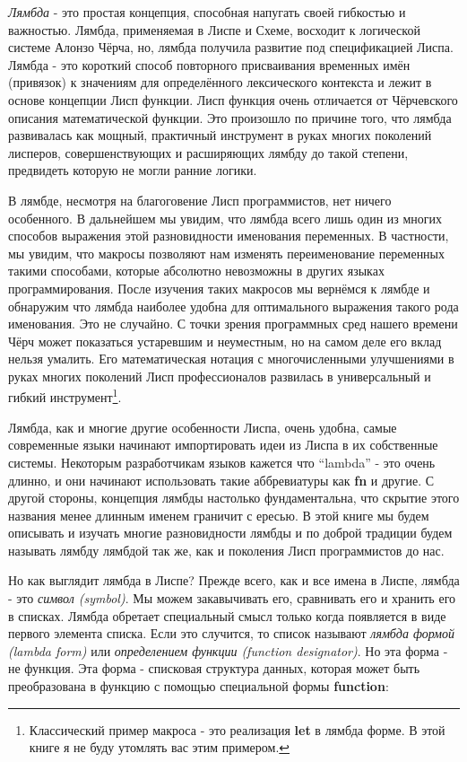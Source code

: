 \emph{Лямбда} - это простая концепция, способная напугать своей гибкостью и важностью. Лямбда, применяемая в Лиспе и Схеме, восходит к логической системе Алонзо Чёрча, но, лямбда получила развитие под спецификацией Лиспа. Лямбда - это короткий способ повторного присваивания временных имён (привязок) к значениям для определённого лексического контекста и лежит в основе концепции Лисп функции. Лисп функция очень отличается от Чёрчевского описания математической функции. Это произошло по причине того, что лямбда развивалась как мощный, практичный инструмент в руках многих поколений лисперов, совершенствующих и расширяющих лямбду до такой степени, предвидеть которую не могли ранние логики.

В лямбде, несмотря на благоговение Лисп программистов, нет ничего особенного. В дальнейшем мы увидим, что лямбда всего лишь один из многих способов выражения этой разновидности именования переменных. В частности, мы увидим, что макросы позволяют нам изменять переименование переменных такими способами, которые абсолютно невозможны в других языках программирования. После изучения таких макросов мы вернёмся к лямбде и обнаружим что лямбда наиболее удобна для оптимального выражения такого рода именования. Это не случайно. С точки зрения программных сред нашего времени Чёрч может показаться устаревшим и неуместным, но на самом деле его вклад нельзя умалить. Его математическая нотация с многочисленными улучшениями в руках многих поколений Лисп профессионалов развилась в универсальный и гибкий инструмент\footnote{Классический пример макроса - это реализация \textbf{let} в лямбда форме. В этой книге я не буду утомлять вас этим примером.}.

Лямбда, как и многие другие особенности Лиспа, очень удобна, самые современные языки начинают импортировать идеи из Лиспа в их собственные системы. Некоторым разработчикам языков кажется что ``lambda'' - это очень длинно, и они начинают использовать такие аббревиатуры как \textbf{fn} и другие. С другой стороны, концепция лямбды настолько фундаментальна, что скрытие этого названия менее длинным именем граничит с ересью. В этой книге мы будем описывать и изучать многие разновидности лямбды и по доброй традиции будем называть лямбду лямбдой так же, как и поколения Лисп программистов до нас.

Но как выглядит лямбда в Лиспе? Прежде всего, как и все имена в Лиспе, лямбда - это \emph{символ (symbol)}. Мы можем закавычивать его, сравнивать его и хранить его в списках. Лямбда обретает специальный смысл только когда появляется в виде первого элемента списка. Если это случится, то список называют \emph{лямбда формой (lambda form)} или \emph{определением функции (function designator)}. Но эта форма - не функция. Эта форма - списковая структура данных, которая может быть преобразована в функцию с помощью специальной формы \textbf{function}:

